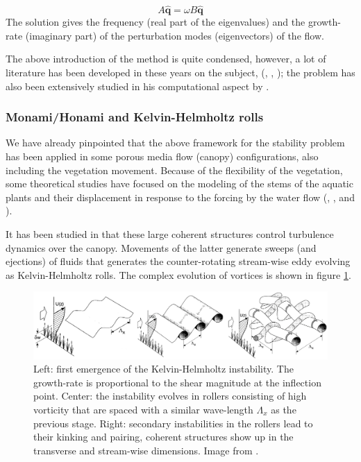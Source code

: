 $$ A \widehat{\mathbf{q}} =  \omega B\widehat{\mathbf{q}} $$
The solution gives the frequency (real part of the eigenvalues) and the growth-rate (imaginary part) of the perturbation modes (eigenvectors) of the flow.

The above introduction of the method is quite condensed, however, a lot of literature has been developed in these years on the subject, (\citet{juniper2014modal}, \citet{criminale2003theory}, \citet{schmid2012stability}); the problem has also been extensively studied in his computational aspect by \citet{canuto1988spectral}.

\subsubsection{Monami/Honami and Kelvin-Helmholtz rolls}

We have already pinpointed that the above framework for the stability problem has been applied in some porous media flow (canopy) configurations, also including the vegetation movement.
Because of the flexibility of the vegetation, some theoretical studies have focused on the
modeling of the stems of the aquatic plants and their displacement in response to the forcing by the
water flow (\citet{py2004mixing}, \citet{patil2010characteristics}, \citet{gosselin2009destabilising} and \citet{py2006frequency}).

It has been studied in \citet{finnigan2000turbulence} that these large coherent structures control turbulence dynamics over the canopy. 
Movements of the latter generate sweeps (and ejections) of fluids that generates the counter-rotating stream-wise eddy evolving as Kelvin-Helmholtz rolls.
The complex evolution of vortices is shown in figure \ref{fig:monai_evol}.

\begin{figure}[h]
	\centering
	\includegraphics[width=1\linewidth]{chapter_1/finn}
	\caption{Left: first emergence of the Kelvin-Helmholtz instability. The growth-rate is proportional to the shear magnitude at the inflection point. Center: the instability evolves in rollers consisting of high vorticity that are spaced with a similar wave-length $\Lambda_x$ as the previous stage.  Right: secondary instabilities in the rollers lead to their kinking and pairing, coherent structures show up in the transverse and stream-wise dimensions. Image from \citet{finnigan2000turbulence}.}
	\label{fig:monai_evol}
\end{figure}



